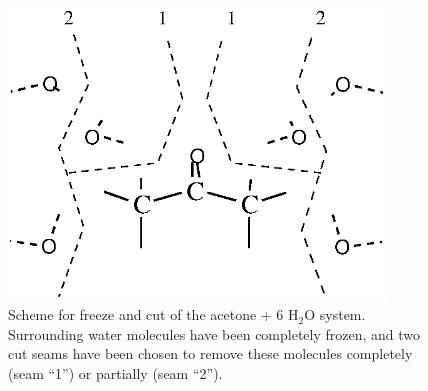 \begin{figure}[ht]
\begin{center}
\includegraphics[width=10cm,keepaspectratio]{02_localization/images/acetone-water-frzcut-schema.eps}
\caption{\footnotesize Scheme for freeze and cut of the acetone + 6 H$_2$O
system. Surrounding water molecules have been completely frozen, and two cut
seams have been chosen to remove these molecules completely (seam ``1'') or
partially (seam ``2''). }
\label{fig:acetone-water-frzcut-schema}
\end{center}
\end{figure}
